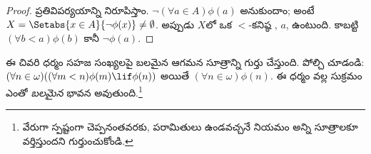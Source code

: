\documentclass[../../../include/open-logic-section]{subfiles}
\begin{document}
\begin{proof}
ప్రతివిపర్యయాన్ని నిరూపిస్తాం.
$\lnot(\forall a \in
A)\phi(a)$ అనుకుందాం;
అంటే $X = \Setabs{x \in A}{\lnot\phi(x)} \neq
\emptyset$. అప్పుడు
$X$లో ఒక $<$-కనిష్ఠ
,
$a$, ఉంటుంది. కాబట్టి
$(\forall
b < a)\phi(b)$ కానీ
$\lnot \phi(a)$.
\end{proof}\noindent
ఈ చివరి ధర్మం సహజ సంఖ్యలపై బలమైన ఆగమన సూత్రాన్ని గుర్తు చేస్తుంది.
పోల్చి చూడండి:
$(\forall n \in \omega)((\forall m < n)\phi(m)
\lif \phi(n))$ అయితే
$(\forall n \in \omega)\phi(n)$.
ఈ ధర్మం వల్ల సుక్రమం
ఎంతో \emph{బలమైన}
భావన అవుతుంది.\footnote{వేరుగా స్పష్టంగా చెప్పనంతవరకు,
పరామితులు ఉండవచ్చనే నియమం
అన్ని సూత్రాలకూ వర్తిస్తుందని
గుర్తుంచుకోండి.}
\end{document}
